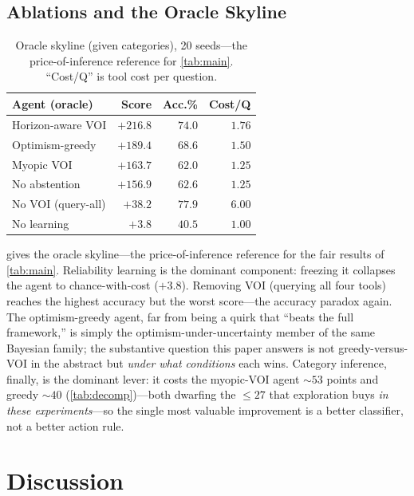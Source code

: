 \documentclass[11pt]{article}
\begin{document}
\subsection{Ablations and the Oracle Skyline}
\label{sec:ablation}

\begin{table}[t]
\centering
\caption{Oracle skyline (given categories), 20 seeds---the price-of-inference reference for \cref{tab:main}. ``Cost/Q'' is tool cost per question.}
\label{tab:skyline}
\small
\begin{tabular}{@{}lrrr@{}}
\toprule
Agent (oracle) & Score & Acc.\% & Cost/Q \\
\midrule
Horizon-aware VOI & $\mathbf{+216.8}$ & $74.0$ & $1.76$ \\
Optimism-greedy & $+189.4$ & $68.6$ & $1.50$ \\
Myopic VOI & $+163.7$ & $62.0$ & $1.25$ \\
No abstention & $+156.9$ & $62.6$ & $1.25$ \\
No VOI (query-all) & $+38.2$ & $77.9$ & $6.00$ \\
No learning & $+3.8$ & $40.5$ & $1.00$ \\
\bottomrule
\end{tabular}
\end{table}

 gives the oracle skyline---the price-of-inference reference for the fair results of \cref{tab:main}. Reliability learning is the dominant component: freezing it collapses the agent to chance-with-cost ($+3.8$). Removing VOI (querying all four tools) reaches the highest accuracy but the worst score---the accuracy paradox again. The optimism-greedy agent, far from being a quirk that ``beats the full framework,'' is simply the optimism-under-uncertainty member of the same Bayesian family; the substantive question this paper answers is not greedy-versus-VOI in the abstract but \emph{under what conditions} each wins. Category inference, finally, is the dominant lever: it costs the myopic-VOI agent ${\sim}53$ points and greedy ${\sim}40$ (\cref{tab:decomp})---both dwarfing the ${\le}27$ that exploration buys \emph{in these experiments}---so the single most valuable improvement is a better classifier, not a better action rule.


\section{Discussion}
\label{sec:discussion}
\end{document}
